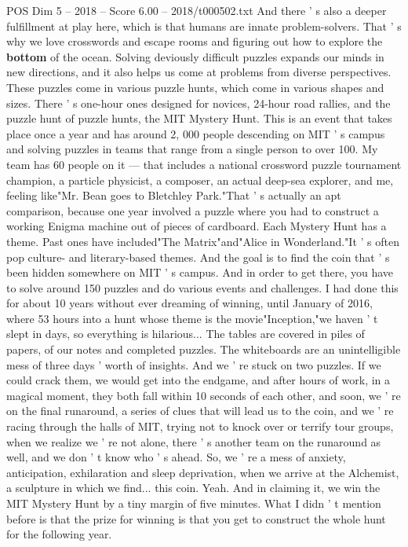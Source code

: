 \begin{textsample}{POS Dim 5 – 2018 – Score 6.00 – 2018/t000502.txt}
And there ' s also a deeper fulfillment at play here, which is that humans are innate problem-solvers.
That ' s why we love crosswords and escape rooms and figuring out how to explore the \textbf{bottom} of the ocean.
Solving deviously difficult puzzles expands our minds in new directions, and it also helps us come at problems from diverse perspectives.
These puzzles come in various puzzle hunts, which come in various shapes and sizes.
There ' s one-hour ones designed for novices, 24-hour road rallies, and the puzzle hunt of puzzle hunts, the MIT Mystery Hunt.
This is an event that takes place once a year and has around 2, 000 people descending on MIT ' s campus and solving puzzles in teams that range from a single person to over 100.
My team has 60 people on it — that includes a national crossword puzzle tournament champion, a particle physicist, a composer, an actual deep-sea explorer, and me, feeling like"Mr.
Bean goes to Bletchley Park."That ' s actually an apt comparison, because one year involved a puzzle where you had to construct a working Enigma machine out of pieces of cardboard.
Each Mystery Hunt has a theme.
Past ones have included"The Matrix"and"Alice in Wonderland."It ' s often pop culture- and literary-based themes.
And the goal is to find the coin that ' s been hidden somewhere on MIT ' s campus.
And in order to get there, you have to solve around 150 puzzles and do various events and challenges.
I had done this for about 10 years without ever dreaming of winning, until January of 2016, where 53 hours into a hunt whose theme is the movie"Inception,"we haven ' t slept in days, so everything is hilarious...
The tables are covered in piles of papers, of our notes and completed puzzles.
The whiteboards are an unintelligible mess of three days ' worth of insights.
And we ' re stuck on two puzzles.
If we could crack them, we would get into the endgame, and after hours of work, in a magical moment, they both fall within 10 seconds of each other, and soon, we ' re on the final runaround, a series of clues that will lead us to the coin, and we ' re racing through the halls of MIT, trying not to knock over or terrify tour groups, when we realize we ' re not alone, there ' s another team on the runaround as well, and we don ' t know who ' s ahead.
So, we ' re a mess of anxiety, anticipation, exhilaration and sleep deprivation, when we arrive at the Alchemist, a sculpture in which we find... this coin.
Yeah.
And in claiming it, we win the MIT Mystery Hunt by a tiny margin of five minutes.
What I didn ' t mention before is that the prize for winning is that you get to construct the whole hunt for the following year.

\end{textsample}
